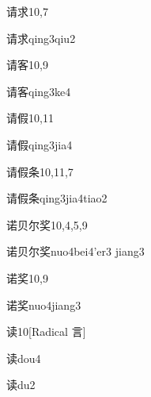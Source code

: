 \begin{entry}{请求}{10,7}
  \begin{phonetics}{请求}{qing3qiu2}
  \end{phonetics}
\end{entry}

\begin{entry}{请客}{10,9}
  \begin{phonetics}{请客}{qing3ke4}
  \end{phonetics}
\end{entry}

\begin{entry}{请假}{10,11}
  \begin{phonetics}{请假}{qing3jia4}
  \end{phonetics}
\end{entry}

\begin{entry}{请假条}{10,11,7}
  \begin{phonetics}{请假条}{qing3jia4tiao2}
  \end{phonetics}
\end{entry}

\begin{entry}{诺贝尔奖}{10,4,5,9}
  \begin{phonetics}{诺贝尔奖}{nuo4bei4'er3 jiang3}
  \end{phonetics}
\end{entry}

\begin{entry}{诺奖}{10,9}
  \begin{phonetics}{诺奖}{nuo4jiang3}
  \end{phonetics}
\end{entry}

\begin{entry}{读}{10}[Radical 言]
  \begin{phonetics}{读}{dou4}
  \end{phonetics}
  \begin{phonetics}{读}{du2}
  \end{phonetics}
\end{entry}

